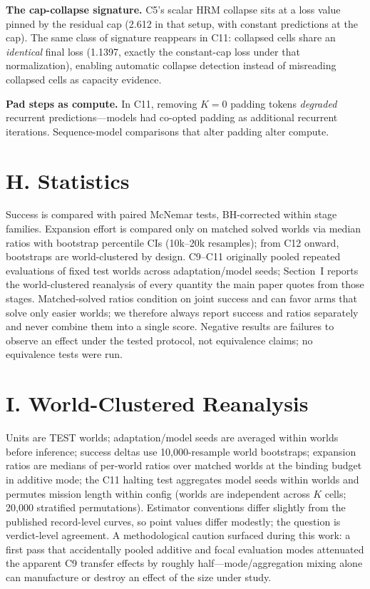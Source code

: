 \documentclass[letterpaper]{article} %
\newcommand{\stage}[1]{\textsc{#1}}
\begin{document}
\textbf{The cap-collapse signature.} \stage{C5}'s scalar HRM collapse sits at a loss value pinned by the residual cap (2.612 in that setup, with constant predictions at the cap). The same class of signature reappears in \stage{C11}: collapsed cells share an \emph{identical} final loss (1.1397, exactly the constant-cap loss under that normalization), enabling automatic collapse detection instead of misreading collapsed cells as capacity evidence.

\textbf{Pad steps as compute.} In \stage{C11}, removing $K{=}0$ padding tokens \emph{degraded} recurrent predictions---models had co-opted padding as additional recurrent iterations. Sequence-model comparisons that alter padding alter compute.

\section{H. Statistics}

Success is compared with paired McNemar tests, BH-corrected within stage families. Expansion effort is compared only on matched solved worlds via median ratios with bootstrap percentile CIs (10k--20k resamples); from \stage{C12} onward, bootstraps are world-clustered by design. \stage{C9}--\stage{C11} originally pooled repeated evaluations of fixed test worlds across adaptation/model seeds; Section~I reports the world-clustered reanalysis of every quantity the main paper quotes from those stages. Matched-solved ratios condition on joint success and can favor arms that solve only easier worlds; we therefore always report success and ratios separately and never combine them into a single score. Negative results are failures to observe an effect under the tested protocol, not equivalence claims; no equivalence tests were run.

\section{I. World-Clustered Reanalysis}

Units are TEST worlds; adaptation/model seeds are averaged within worlds before inference; success deltas use 10{,}000-resample world bootstraps; expansion ratios are medians of per-world ratios over matched worlds at the binding budget in additive mode; the \stage{C11} halting test aggregates model seeds within worlds and permutes mission length within config (worlds are independent across $K$ cells; 20{,}000 stratified permutations). Estimator conventions differ slightly from the published record-level curves, so point values differ modestly; the question is verdict-level agreement. A methodological caution surfaced during this work: a first pass that accidentally pooled additive and focal evaluation modes attenuated the apparent \stage{C9} transfer effects by roughly half---mode/aggregation mixing alone can manufacture or destroy an effect of the size under study.
\end{document}
